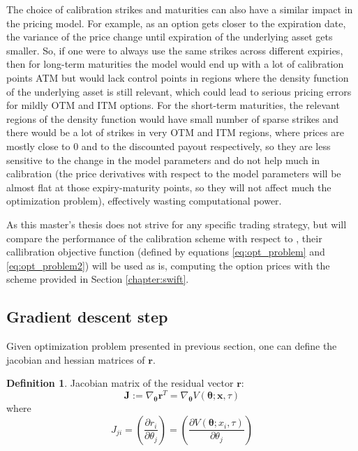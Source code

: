\documentclass[12,twoside]{mammeTFM}
\theoremstyle{definition}
\newtheorem{definition}[thm]{Definition}
\theoremstyle{remark}
\begin{document}
The choice of calibration strikes and maturities can also have a similar impact in the pricing model. For example, as an option gets closer to the expiration date, the variance of the price change until expiration of the underlying asset gets smaller. So, if one were to always use the same strikes across different expiries, then for long-term maturities the model would end up with a lot of calibration points ATM but would lack control points in regions where the density function of the underlying asset is still relevant, which could lead to serious pricing errors for mildly OTM and ITM options. For the short-term maturities, the relevant regions of the density function would have small number of sparse strikes and there would be a lot of strikes in very OTM and ITM regions, where prices are mostly close to 0 and to the discounted payout respectively, so they are less sensitive to the change in the model parameters and do not help much in calibration (the price derivatives with respect to the model parameters will be almost flat at those expiry-maturity points, so they will not affect much the optimization problem), effectively wasting computational power.

As this master's thesis does not strive for any specific trading strategy, but will compare the performance of the calibration scheme with respect to \cite{cui17}, their callibration objective function (defined by equations \ref{eq:opt_problem} and \ref{eq:opt_problem2}) will be used as is, computing the option prices with the scheme provided in Section \ref{chapter:swift}.

\subsection{Gradient descent step} \label{sec:gradient}

Given optimization problem presented in previous section, one can define the jacobian and hessian matrices of $\boldsymbol{r}$.

\begin{definition} Jacobian matrix of the residual vector $\boldsymbol{r}$:
\begin{equation}
\boldsymbol{J} := \nabla_{\boldsymbol{\theta}} \boldsymbol{r}^T = \nabla_{\boldsymbol{\theta}} V(\boldsymbol{\theta}; \boldsymbol{x}, \tau)
\end{equation}
where
\begin{equation}
J_{ji} = \left(\dfrac{\partial r_i}{\partial \theta_j} \right) = \left(\dfrac{\partial V(\boldsymbol{\theta}; x_i, \tau)}{\partial \theta_j} \right)
\end{equation}
\end{definition}
\end{document}
